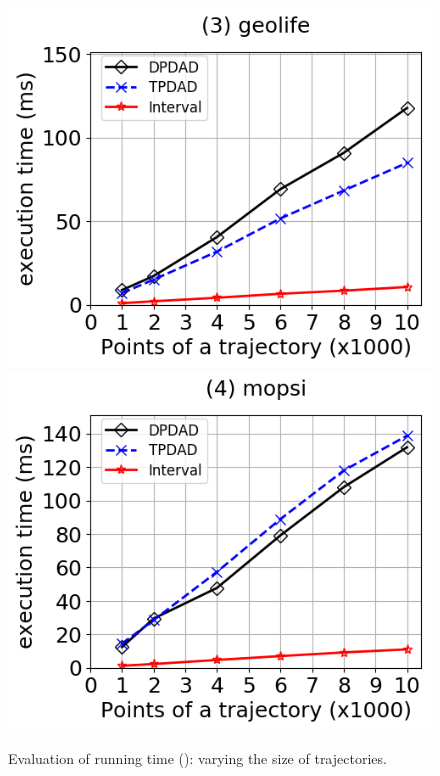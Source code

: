 \begin{figure}[tb!]
	\includegraphics[scale=0.315]{Figures/Exp-DAD-time-size-geolife.png}	\hspace{1ex}
	\includegraphics[scale=0.315]{Figures/Exp-DAD-time-size-mopsi.png}		
	\vspace{-3ex}
	\caption{\small Evaluation of running time (\dad): varying the size of trajectories.}\label{fig:time-size-dad}
	\vspace{-2ex}
\end{figure}




